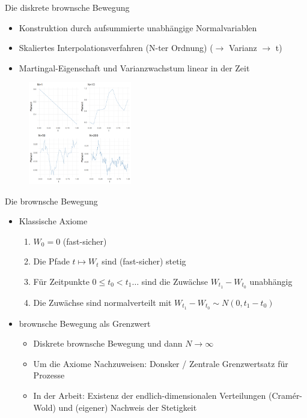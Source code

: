 \documentclass{beamer}
\begin{document}
\begin{frame}{Die diskrete brownsche Bewegung}
  \begin{itemize}
    \item Konstruktion durch aufsummierte unabhängige Normalvariablen
    \item Skaliertes Interpolationsverfahren (N-ter Ordnung) ($\rightarrow$ Varianz $\to$ t)
    \item Martingal-Eigenschaft und Varianzwachstum linear in der Zeit
  \end{itemize}
  \begin{figure}
    \centering
  \includegraphics[width=0.4\textwidth]{../thesis/images/disrete_bb.png}
  \end{figure}
\end{frame}

\begin{frame}{Die brownsche Bewegung}
  \begin{itemize}
  \item Klassische Axiome
    \begin{enumerate}
      \item $W_0=0$ (fast-sicher)
      \item Die Pfade $t \mapsto W_t$ sind (fast-sicher) stetig
      \item Für Zeitpunkte $0 \le t_0 < t_1 \dots$ sind die Zuwächse $W_{t_1} - W_{t_0}$ unabhängig
      \item Die Zuwächse sind normalverteilt mit $W_{t_1} - W_{t_0} \sim N(0, t_1 - t_0)$
    \end{enumerate}
  \pause
  \item brownsche Bewegung als Grenzwert
    \begin{itemize}
      \item Diskrete brownsche Bewegung und dann $N \to \infty$
      \item Um die Axiome Nachzuweisen: Donsker / Zentrale Grenzwertsatz für Prozesse
      \item In der Arbeit: Existenz der endlich-dimensionalen Verteilungen (Cramér-Wold) und (eigener) Nachweis der Stetigkeit
    \end{itemize}
\end{itemize}
\end{frame}
\end{document}

